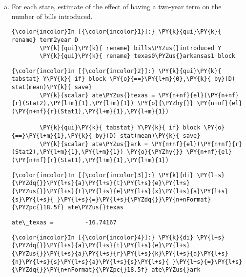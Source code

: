 \documentclass[11pt,notitlepage]{article}\usepackage[]{graphicx}\usepackage[]{color}
\makeatletter
\newenvironment{kframe}{%
 \def\at@end@of@kframe{}%
 \ifinner\ifhmode%
  \def\at@end@of@kframe{\end{minipage}}%
  \begin{minipage}{\columnwidth}%
 \fi\fi%
 \def\FrameCommand##1{\hskip\@totalleftmargin \hskip-\fboxsep
 \colorbox{shadecolor}{##1}\hskip-\fboxsep
     \hskip-\linewidth \hskip-\@totalleftmargin \hskip\columnwidth}%
 \MakeFramed {\advance\hsize-\width
   \@totalleftmargin\z@ \linewidth\hsize
   \@setminipage}}%
 {\par\unskip\endMakeFramed%
 \at@end@of@kframe}
\newenvironment{knitrout}{}{} %
\makeatother
\begin{document}
\begin{enumerate}[a)]
\item For each state, estimate of the effect of having a two-year term on the number of bills introduced.
\begin{knitrout}
\color{fgcolor}\begin{kframe}
    \begin{Verbatim}[commandchars=\\\{\}]
{\color{incolor}In [{\color{incolor}1}]:} \PY{k}{qui}\PY{k}{ rename} term2year D
        \PY{k}{qui}\PY{k}{ rename} bills\PYZus{}introduced Y
        \PY{k}{qui}\PY{k}{ rename} texas0\PYZus{}arkansas1 block
\end{Verbatim}

    \begin{Verbatim}[commandchars=\\\{\}]
{\color{incolor}In [{\color{incolor}2}]:} \PY{k}{qui}\PY{k}{ tabstat} Y\PY{k}{ if} block \PY{o}{==}\PY{l+m}{0},\PY{k}{ by}(D) stat(mean)\PY{k}{ save}	
        \PY{k}{scalar} ate\PYZus{}texas = \PY{n+nf}{el}(\PY{n+nf}{r}(Stat2),\PY{l+m}{1},\PY{l+m}{1}) \PY{o}{\PYZhy{}} \PY{n+nf}{el}(\PY{n+nf}{r}(Stat1),\PY{l+m}{1},\PY{l+m}{1})
        
        \PY{k}{qui}\PY{k}{ tabstat} Y\PY{k}{ if} block \PY{o}{==}\PY{l+m}{1},\PY{k}{ by}(D) stat(mean)\PY{k}{ save}	
        \PY{k}{scalar} ate\PYZus{}ark = \PY{n+nf}{el}(\PY{n+nf}{r}(Stat2),\PY{l+m}{1},\PY{l+m}{1}) \PY{o}{\PYZhy{}} \PY{n+nf}{el}(\PY{n+nf}{r}(Stat1),\PY{l+m}{1},\PY{l+m}{1})
\end{Verbatim}

    \begin{Verbatim}[commandchars=\\\{\}]
{\color{incolor}In [{\color{incolor}3}]:} \PY{k}{di} \PY{l+s}{\PYZdq{}}\PY{l+s}{a}\PY{l+s}{t}\PY{l+s}{e}\PY{l+s}{\PYZus{}}\PY{l+s}{t}\PY{l+s}{e}\PY{l+s}{x}\PY{l+s}{a}\PY{l+s}{s}\PY{l+s}{ }\PY{l+s}{=}\PY{l+s}{\PYZdq{}}\PY{n+nFormat}{\PYZpc{}18.5f} ate\PYZus{}texas
\end{Verbatim}

    \begin{Verbatim}[commandchars=\\\{\}]
ate\_texas =         -16.74167

    \end{Verbatim}

    \begin{Verbatim}[commandchars=\\\{\}]
{\color{incolor}In [{\color{incolor}4}]:} \PY{k}{di} \PY{l+s}{\PYZdq{}}\PY{l+s}{a}\PY{l+s}{t}\PY{l+s}{e}\PY{l+s}{\PYZus{}}\PY{l+s}{a}\PY{l+s}{r}\PY{l+s}{k}\PY{l+s}{a}\PY{l+s}{n}\PY{l+s}{s}\PY{l+s}{a}\PY{l+s}{s}\PY{l+s}{ }\PY{l+s}{=}\PY{l+s}{\PYZdq{}}\PY{n+nFormat}{\PYZpc{}18.5f} ate\PYZus{}ark
\end{Verbatim}


\end{kframe}
\end{knitrout}
\end{enumerate}
\end{document}
